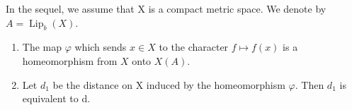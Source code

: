 In the sequel, we assume that X is a compact metric space. We denote by \(A = \operatorname{Lip}_{b}(X)\).

\begin{enumerate}
\def\labelenumi{\alph{enumi})}
\setcounter{enumi}{4}
\item
  The map \(\varphi\) which sends \(x \in X\) to the character \(f \mapsto f(x)\) is a homeomorphism from \(X\) onto \(X(A)\).
\item
  Let \(d_{1}\) be the distance on X induced by the homeomorphism \(\varphi\). Then \(d_{1}\) is equivalent to d.
\end{enumerate}

